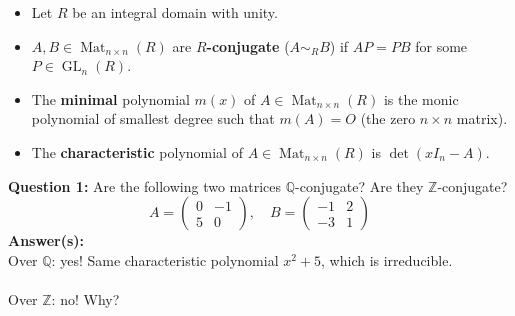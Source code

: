 \documentclass[aspectratio=169,handout,usenames,dvipsnames]{beamer}
\def\Q{\mathbb{Q}}
\def\Z{\mathbb{Z}}
\DeclareMathOperator{\Mat}{Mat}
\DeclareMathOperator{\GL}{GL}
\begin{document}
\begin{frame}{}
\begin{columns}
\begin{column}{0.5\textwidth}
\begin{center}
           \end{center}
      \end{column}
   \end{columns}
\end{frame}

\begin{frame}{}
   \begin{itemize}
      \item Let $R$ be an integral domain with unity.
      \item $A,B \in \Mat_{n\times n}(R)$ are {\bf $R$-conjugate} ($A\sim_R B$) if $AP=PB$ for some $P\in \GL_n(R)$.
      \item The {\bf minimal} polynomial $m(x)$ of $A \in \Mat_{n\times n}(R)$ is the monic polynomial of smallest degree such that $m(A) = O$ (the zero $n\times n$ matrix).
      \item The {\bf characteristic} polynomial of $A \in \Mat_{n\times n}(R)$ is $\det(xI_n-A)$.
   \end{itemize}
   \pause 
   {\bf Question 1:} 
   Are the following two matrices $\Q$-conjugate? Are they $\Z$-conjugate?
   \[
   A=\begin{pmatrix}
      0 & -1 \\ 5 & 0
   \end{pmatrix}, \quad
   B=\begin{pmatrix}
      -1 & 2 \\ -3 & 1
   \end{pmatrix}
   \]
   \pause
   {\bf Answer(s):}\\ 
   \pause Over $\Q$: yes! Same characteristic polynomial $x^2+5$, which is irreducible.\\
   \\    
   \pause Over $\Z$: no! Why?
\end{frame}
\end{document}

